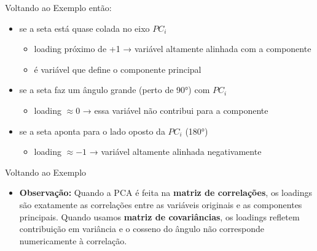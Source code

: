 \documentclass[
  ignorenonframetext,
  aspectratio=169,
]{beamer}
\providecommand{\tightlist}{%
  \setlength{\itemsep}{0pt}\setlength{\parskip}{0pt}}
\begin{document}
\begin{frame}{Voltando ao Exemplo}
\label{voltando-ao-exemplo-12}
então:

\begin{itemize}
\tightlist
\item
  se a seta está quase colada no eixo \(PC_i\)

  \begin{itemize}
  \tightlist
  \item
    loading próximo de +1 → variável altamente alinhada com a componente
  \item
    é variável que define o componente principal
  \end{itemize}
\item
  se a seta faz um ângulo grande (perto de 90°) com \(PC_i\)

  \begin{itemize}
  \tightlist
  \item
    loading \(\approx 0\) → essa variável não contribui para a
    componente
  \end{itemize}
\item
  se a seta aponta para o lado oposto da \(PC_i\) (180°)

  \begin{itemize}
  \tightlist
  \item
    loading \(\approx -1\) → variável altamente alinhada negativamente
  \end{itemize}
\end{itemize}
\end{frame}

\begin{frame}{Voltando ao Exemplo}
\label{voltando-ao-exemplo-13}
\begin{itemize}
\tightlist
\item
  \textbf{Observação:} Quando a PCA é feita na \textbf{matriz de
  correlações}, os loadings são exatamente as correlações entre as
  variáveis originais e as componentes principais. Quando usamos
  \textbf{matriz de covariâncias}, os loadings refletem contribuição em
  variância e o cosseno do ângulo não corresponde numericamente à
  correlação.
\end{itemize}
\end{frame}
\end{document}
